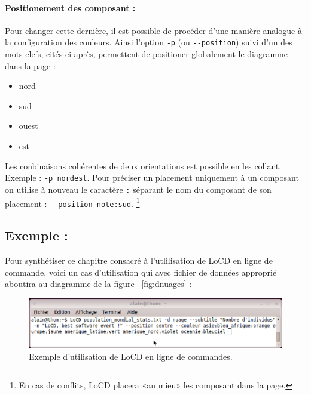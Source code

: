   \paragraph{Positionement des composant :}
  \label{par:poscompo}
  Pour changer cette dernière, il est possible de procéder d'une manière analogue à la configuration des couleurs. Ainsi l'option \verb+-p+ (ou \verb+--position+) suivi d'un des mots clefs, cités ci-après, permettent de positioner globalement le diagramme dans la page : 
  \begin{itemize}
  \item
    nord
  \item
    sud
  \item
    ouest
  \item
    est
  \end{itemize}
  Les conbinaisons cohérentes de deux orientations est possible en les collant. Exemple : \verb+-p nordest+. Pour préciser un placement uniquement à un composant on utilise à nouveau le caractère \verb+:+ séparant le nom du composant de son placement : \verb+--position note:sud+. 
  \footnote{En cas de conflits, LoCD placera «au mieu» les composant dans la page.}

  \subsection{Exemple :}
  \label{subsec:excom}
  Pour synthétiser ce chapitre consacré à l'utlilisation de LoCD en ligne de commande, voici un cas d'utilisation qui avec fichier de données approprié aboutira au diagramme de la figure ~\ref{fig:dnuages} : 

  \begin{figure}[htbp]
    \centering
    \includegraphics[scale=0.40]{img/ecommandes}
    \caption{Exemple d'utilisation de LoCD en ligne de commandes.}
    \label{fig:ecommandes}
  \end{figure}  
